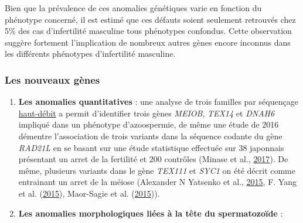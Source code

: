 \documentclass[12pt,twoside]{reedthesis}
\theoremstyle{definition}
\theoremstyle{definition}
\theoremstyle{remark}
\begin{document}
  Bien que la prévalence de ces anomalies génétiques varie en fonction du
  phénotype concerné, il est estimé que ces défauts soient seulement
  retrouvés chez 5\% des cas d'infertilité masculine tous phénotypes
  confondus. Cette observation suggère fortement l'implication de nombreux
  autres gènes encore inconnus dans les différents phénotypes
  d'infertilité masculine.
  
  \newpage
  
  \subsubsection{Les nouveaux gènes}\label{les-nouveaux-genes}
  
  \begin{enumerate}
  \def\labelenumi{\arabic{enumi}.}
  \item
    \textbf{Les anomalies quantitatives} : une analyse de trois familles
    par séquençage \protect\hyperlink{ngs}{haut-débit} a permit
    d'identifier trois gènes \emph{MEIOB}, \emph{TEX14} et \emph{DNAH6}
    impliqué dans un phénotype d'azoospermie, de même une étude de 2016
    démentre l'association de trois variants dans la séquence codante du
    gène \emph{RAD21L} en se basant sur une étude statistique effectuée
    sur 38 japonnais présentant un arret de la fertilité et 200 contrôles
    (Minase et al., \protect\hyperlink{ref-Minase2017}{2017}). De même,
    plusieurs variants dans le gène \emph{TEX111} et \emph{SYC1} on été
    décrit comme entrainant un arret de la méiose (Alexander N Yatsenko et
    al., \protect\hyperlink{ref-Yatsenko2015}{2015}, F. Yang et al.
    (\protect\hyperlink{ref-Yang2015}{2015}), Maor-Sagie et al.
    (\protect\hyperlink{ref-Maor-Sagie2015}{2015})).
  \item
    \textbf{Les anomalies morphologiques liées à la tête du spermatozoïde}
    :
  

\end{enumerate}
\end{document}
